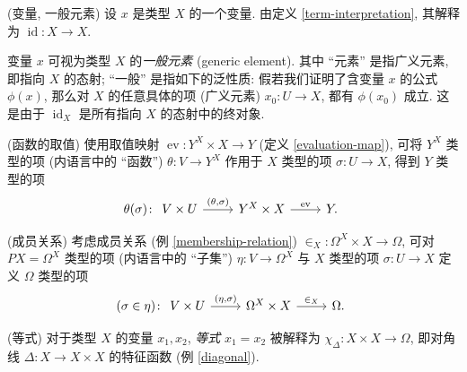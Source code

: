 \begin{example}
	{(变量, 一般元素)}
	设 $x$ 是类型 $X$ 的一个变量. 由定义 \ref{term-interpretation}, 其解释为 $\operatorname{id}\colon X\to X$.
	
	变量 $x$ 可视为类型 $X$ 的\emph{一般元素} (generic element).
	其中 ``元素'' 是指广义元素, 即指向 $X$ 的态射; ``一般'' 是指如下的泛性质: 假若我们证明了含变量 $x$ 的公式 $\phi(x)$,
	那么对 $X$ 的任意具体的项 (广义元素) $x_0\colon U\to X$, 都有 $\phi(x_0)$ 成立.
	这是由于 $\operatorname{id}_X$ 是所有指向 $X$ 的态射中的终对象.
\end{example}

\begin{example}
	{(函数的取值)}
	使用取值映射 $\operatorname{ev}\colon Y^X\times X\to Y$ (定义 \ref{evaluation-map}),
	可将 $Y^X$ 类型的项 (内语言中的 ``函数'') $\theta\colon V\to Y^X$
	作用于 $X$ 类型的项 $\sigma \colon U \to X$,
	得到 $Y$ 类型的项
	\[\theta(\sigma)\colon
	\begin{tikzcd}[ampersand replacement=\&]
		{V\times U} \& {Y^X\times X} \& Y.
		\arrow["{(\theta,\sigma)}", from=1-1, to=1-2]
		\arrow["{\operatorname{ev}}", from=1-2, to=1-3]
	\end{tikzcd}\]
\end{example}

\begin{example}
	{(成员关系)}
	考虑成员关系 (例 \ref{membership-relation}) ${\in_X} \colon \Omega^X\times X \to \Omega$,
	可对 $PX=\Omega^X$ 类型的项 (内语言中的 ``子集'') $\eta\colon V \to \Omega^X$ 与 $X$ 类型的项 $\sigma\colon U\to X$ 定义 $\Omega$ 类型的项
	\[
	(\sigma \in \eta) \colon 
	\begin{tikzcd}[ampersand replacement=\&]
		{V\times U} \& {\Omega^X\times X} \& \Omega.
		\arrow["{(\eta,\sigma)}", from=1-1, to=1-2]
		\arrow["{\in_X}", from=1-2, to=1-3]
	\end{tikzcd}\]
\end{example}

\begin{example}
	{(等式)}
	对于类型 $X$ 的变量 $x_1,x_2$, \emph{等式} $x_1 = x_2$ 被解释为 $\chi_\Delta\colon X\times X\to\Omega$, 即对角线 $\Delta\colon X\to X\times X$ 的特征函数 (例 \ref{diagonal}).
\end{example}

